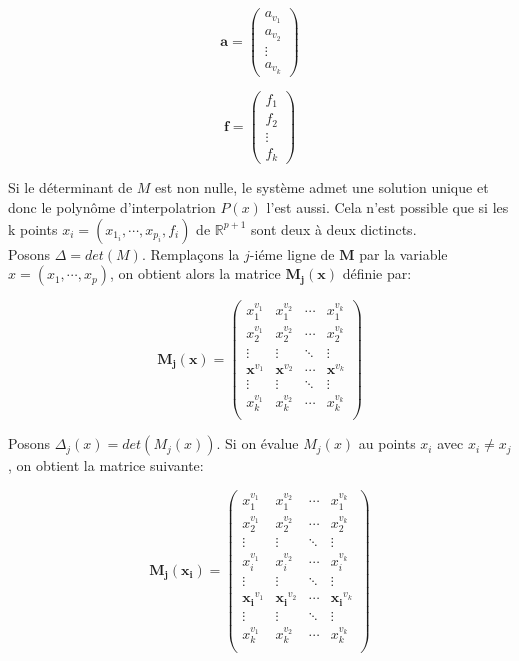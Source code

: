 \documentclass[a4paper,12pt]{article}
\begin{document}
\[
\mathbf{a}= \begin{pmatrix}
    a_{v_1} \\ 
    a_{v_2} \\ 
    \vdots \\ 
    a_{v_k}
    		\end{pmatrix}
\]

\[
\mathbf{f}= \begin{pmatrix}
    f_1 \\ 
    f_2 \\ 
    \vdots \\ 
    f_k
    		\end{pmatrix}
\]

Si le déterminant de $M$ est non nulle, le système admet une solution unique et donc le polynôme d'interpolatrion $P(x)$ l'est aussi.
Cela n'est possible que si les k points $ x_i = (x_{1_i}, \cdots ,x_{p_i},f_i)$ de $\mathbb{R}^{p+1}$ sont deux à deux dictincts.\\
Posons $\Delta = det (M)$. Remplaçons la $j$-iéme ligne de $\mathbf{M}$ par la variable $ x = (x_1, \cdots ,x_p)$, on obtient alors la matrice $\mathbf{M_j(x)}$ définie par:

\[
\mathbf{M_j(\mathbf{x})} =\begin{pmatrix}
	x_1^{v_1} & x_1^{v_2} & \cdots & x_1^{v_k}\\
    x_2^{v_1} & x_2^{v_2} & \cdots & x_2^{v_k}\\
    \vdots & \vdots & \ddots & \vdots \\
    \mathbf{x}^{v_1} & \mathbf{x}^{v_2} & \cdots & \mathbf{x}^{v_k}\\
    \vdots & \vdots & \ddots & \vdots \\
    x_k^{v_1} & x_k^{v_2} & \cdots & x_k^{v_k}\\
   \end{pmatrix}
\]

Posons $ \Delta_j(x)= det(M_j(x))$. Si on évalue $M_j(x)$ au points $x_i$ avec $x_i \neq x_j$, on obtient la matrice suivante:

\[
\mathbf{M_j(\mathbf{x_i})} =\begin{pmatrix}
	x_1^{v_1} & x_1^{v_2} & \cdots & x_1^{v_k}\\
    x_2^{v_1} & x_2^{v_2} & \cdots & x_2^{v_k}\\
    \vdots & \vdots & \ddots & \vdots \\
    x_i^{v_1} & x_i^{v_2} & \cdots & x_i^{v_k}\\
    \vdots & \vdots & \ddots & \vdots \\
    \mathbf{x_i}^{v_1} & \mathbf{x_i}^{v_2} & \cdots & \mathbf{x_i}^{v_k}\\
    \vdots & \vdots & \ddots & \vdots \\
    x_k^{v_1} & x_k^{v_2} & \cdots & x_k^{v_k}\\
   \end{pmatrix}
\]
\end{document}
